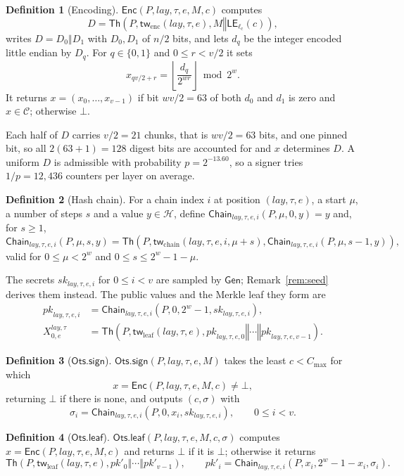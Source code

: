 \documentclass[11pt]{article}
\theoremstyle{definition}
\newtheorem{definition}{Definition}[section]
\theoremstyle{plain}
\theoremstyle{remark}
\newcommand{\Th}{\mathsf{Th}}
\newcommand{\Enc}{\mathsf{Enc}}
\newcommand{\Gen}{\mathsf{Gen}}
\newcommand{\Chain}{\mathsf{Chain}}
\newcommand{\LE}{\mathsf{LE}}
\newcommand{\concat}{\mathbin\Vert}
\newcommand{\sk}{\mathit{sk}}
\newcommand{\pk}{\mathit{pk}}
\newcommand{\lctr}{\ell_{\mathrm{c}}}
\newcommand{\cmax}{C_{\max}}
\newcommand{\lay}{\mathit{lay}}
\newcommand{\OtsSign}{\mathsf{Ots.sign}}
\newcommand{\OtsLeaf}{\mathsf{Ots.leaf}}
\begin{document}
\begin{definition}[Encoding]
$\Enc(P,\lay,\tau,e,M,c)$ computes
\[
  D=\Th\!\left(P,\mathsf{tw}_{\mathrm{enc}}(\lay,\tau,e),M\concat\LE_{\lctr}(c)\right),
\]
writes $D=D_0\concat D_1$ with $D_0,D_1$ of $n/2$ bits, and lets $d_q$ be the integer encoded little endian by $D_q$. For $q\in\{0,1\}$ and $0\leq r<v/2$ it sets
\[
  x_{qv/2+r}=\left\lfloor\frac{d_q}{2^{wr}}\right\rfloor\bmod 2^w .
\]
It returns $x=(x_0,\ldots,x_{v-1})$ if bit $wv/2=63$ of both $d_0$ and $d_1$ is zero and $x\in\mathcal C$; otherwise $\bot$.
\end{definition}

Each half of $D$ carries $v/2=21$ chunks, that is $wv/2=63$ bits, and one pinned bit, so all $2(63+1)=128$ digest bits are accounted for and $x$ determines $D$. A uniform $D$ is admissible with probability $p=2^{-13.60}$, so a signer tries $1/p=12{,}436$ counters per layer on average.

\begin{definition}[Hash chain]
For a chain index $i$ at position $(\lay,\tau,e)$, a start $\mu$, a number of steps $s$ and a value $y\in\mathcal H$, define $\Chain_{\lay,\tau,e,i}(P,\mu,0,y)=y$ and, for $s\geq1$,
\[
  \Chain_{\lay,\tau,e,i}(P,\mu,s,y)=\Th\!\left(P,\mathsf{tw}_{\mathrm{chain}}(\lay,\tau,e,i,\mu+s),\Chain_{\lay,\tau,e,i}(P,\mu,s-1,y)\right),
\]
valid for $0\leq\mu<2^w$ and $0\leq s\leq2^w-1-\mu$.
\end{definition}

The secrets $\sk_{\lay,\tau,e,i}$ for $0\leq i<v$ are sampled by $\Gen$; Remark~\ref{rem:seed} derives them instead. The public values and the Merkle leaf they form are
\[
\begin{aligned}
  \pk_{\lay,\tau,e,i}&=\Chain_{\lay,\tau,e,i}\!\left(P,0,2^w-1,\sk_{\lay,\tau,e,i}\right),\\
  X^{\lay,\tau}_{0,e}&=\Th\!\left(P,\mathsf{tw}_{\mathrm{leaf}}(\lay,\tau,e),\pk_{\lay,\tau,e,0}\concat\cdots\concat\pk_{\lay,\tau,e,v-1}\right).
\end{aligned}
\]

\begin{definition}[$\OtsSign$]
$\OtsSign(P,\lay,\tau,e,M)$ takes the least $c<\cmax$ for which
\[
  x=\Enc(P,\lay,\tau,e,M,c)\neq\bot,
\]
returning $\bot$ if there is none, and outputs $(c,\sigma)$ with
\[
  \sigma_i=\Chain_{\lay,\tau,e,i}\!\left(P,0,x_i,\sk_{\lay,\tau,e,i}\right),\qquad 0\leq i<v.
\]
\end{definition}

\begin{definition}[$\OtsLeaf$]
$\OtsLeaf(P,\lay,\tau,e,M,c,\sigma)$ computes $x=\Enc(P,\lay,\tau,e,M,c)$ and returns $\bot$ if it is $\bot$; otherwise it returns
\[
  \Th\!\left(P,\mathsf{tw}_{\mathrm{leaf}}(\lay,\tau,e),\pk'_0\concat\cdots\concat\pk'_{v-1}\right),
  \qquad
  \pk'_i=\Chain_{\lay,\tau,e,i}\!\left(P,x_i,2^w-1-x_i,\sigma_i\right).
\]
\end{definition}
\end{document}
